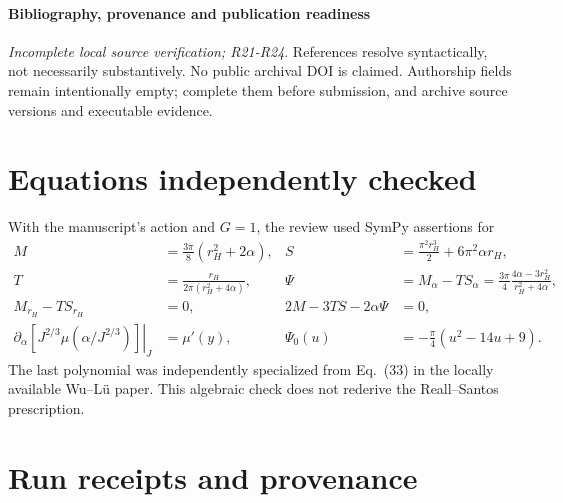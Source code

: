 \documentclass[10pt,a4paper]{article}
\begin{document}
\paragraph{Bibliography, provenance and publication readiness} \textit{Incomplete local source verification; R21-R24}. References resolve syntactically, not necessarily substantively. No public archival DOI is claimed. Authorship fields remain intentionally empty; complete them before submission, and archive source versions and executable evidence.

\section{Equations independently checked}
With the manuscript's action and $G=1$, the review used SymPy assertions for
\begin{align*}
M&=\frac{3\pi}{8}(r_H^2+2\alpha),& S&=\frac{\pi^2r_H^3}{2}+6\pi^2\alpha r_H,\\
T&=\frac{r_H}{2\pi(r_H^2+4\alpha)},& \Psi&=M_\alpha-TS_\alpha=\frac{3\pi}{4}\frac{4\alpha-3r_H^2}{r_H^2+4\alpha},\\
M_{r_H}-TS_{r_H}&=0,&2M-3TS-2\alpha\Psi&=0,\\
\left.\partial_\alpha[J^{2/3}\mu(\alpha/J^{2/3})]\right|_J&=\mu'(y),&
\Psi_0(u)&=-\frac{\pi}{4}(u^2-14u+9).
\end{align*}
The last polynomial was independently specialized from Eq.~(33) in the locally available Wu--L\"u paper. This algebraic check does not rederive the Reall--Santos prescription.

\section{Run receipts and provenance}
\end{document}
